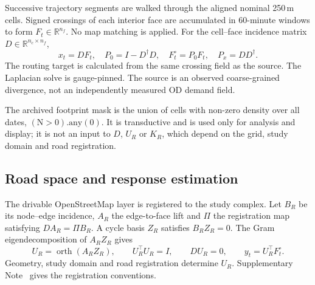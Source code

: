 \documentclass[11pt]{article}
\begin{document}
Successive trajectory segments are walked through the aligned nominal 250\,m cells. Signed crossings of each interior face are accumulated in 60-minute windows to form $F_t\in\mathbb R^{n_f}$. No map matching is applied. For the cell--face incidence matrix $D\in\mathbb R^{n_c\times n_f}$,
\begin{equation}\label{eq:m-project}
 x_t=DF_t,\quad P_0=I-D^\dagger D,\quad F_t^\circ=P_0F_t,
 \quad P_x=DD^\dagger .
\end{equation}
The routing target is calculated from the same crossing field as the source. The Laplacian solve is gauge-pinned. The source is an observed coarse-grained divergence, not an independently measured OD demand field.

The archived footprint mask is the union of cells with non-zero density over all dates, $(\mathrm{N}>0).\mathrm{any}(0)$. It is transductive and is used only for analysis and display; it is not an input to $D$, $U_R$ or $K_R$, which depend on the grid, study domain and road registration.

\subsection{Road space and response estimation}\label{sec:m-cons}

The drivable OpenStreetMap layer \cite{haklay2008} is registered to the study complex. Let $B_R$ be its node--edge incidence, $A_R$ the edge-to-face lift and $\Pi$ the registration map satisfying $DA_R=\Pi B_R$. A cycle basis $Z_R$ satisfies $B_RZ_R=0$. The Gram eigendecomposition of $A_RZ_R$ gives
\begin{equation}\label{eq:m-roadbasis}
 U_R=\operatorname{orth}(A_RZ_R),\qquad U_R^\top U_R=I,
 \qquad DU_R=0,\qquad y_t=U_R^\top F_t^\circ .
\end{equation}
Geometry, study domain and road registration determine $U_R$. Supplementary Note~ gives the registration conventions.
\end{document}
